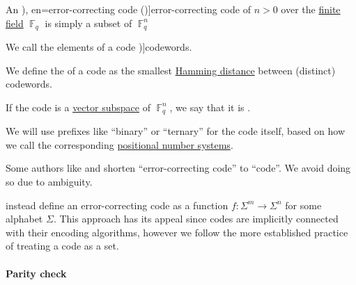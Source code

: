 \begin{definition}\label{def:error_correcting_code}
  An \term[ru=самокорректирующейся код (\cite[289]{Яблонский2003ДискретнаяМатематика}), en=error-correcting code (\cite[def. 19.9]{AroraBarak2009ComputationalComplexity})]{error-correcting code} of  \( n > 0 \) over the \hyperref[def:finite_field]{finite field} \( \BbbF_q \) is simply a subset of \( \BbbF_q^n \)

  \begin{thmenum}
     We call the elements of a code \term[ru=коды (\cite[258]{Яблонский2003ДискретнаяМатематика})]{codewords}.

     We define the  of a code as the smallest \hyperref[def:hamming_distance]{Hamming distance} between (distinct) codewords.

     If the code is a \hyperref[def:vector_space/subobject]{vector subspace} of \( \BbbF_q^n \), we say that it is .
  \end{thmenum}
\end{definition}
\begin{comments}
  \item We will use prefixes like \enquote{binary} or \enquote{ternary} for the code itself, based on how we call the corresponding \hyperref[def:positional_number_system]{positional number systems}.

  \item Some authors like \textcite[75]{ConwaySloane1998SpherePackings} and \textcite[2]{Berlekamp2015AlgebraicCodingTheory} shorten \enquote{error-correcting code} to \enquote{code}. We avoid doing so due to ambiguity.

  \item \Textcite[def. 19.9]{AroraBarak2009ComputationalComplexity} instead define an error-correcting code as a function \( f: \Sigma^m \to \Sigma^n \) for some alphabet \( \Sigma \). This approach has its appeal since codes are implicitly connected with their encoding algorithms, however we follow the more established practice of treating a code as a set.
\end{comments}

\paragraph{Parity check}

